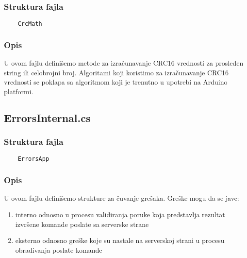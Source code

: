 \documentclass[a4paper]{extarticle}
\begin{document}
		\subsubsection*{Struktura fajla}
	\begin{verbatim}
	CrcMath
	\end{verbatim}
	
	\subsubsection*{Opis}
	U ovom fajlu definišemo metode za izračunavanje CRC16 vrednosti za prosleđen string ili celobrojni broj. Algoritami koji koristimo za izračunavanje CRC16 vrednosti se poklapa sa algoritmom koji je trenutno u upotrebi na Arduino platformi.
	
	\subsection{ErrorsInternal.cs}
	\label{a6}
		\subsubsection*{Struktura fajla}
	\begin{verbatim}
	ErrorsApp
	\end{verbatim}
	
	\subsubsection*{Opis}
	\label{errorsDesc}
	U ovom fajlu definišemo strukture za čuvanje grešaka. Greške mogu da se jave:
	\begin{enumerate}
		\item interno odnosno u procesu validiranja poruke koja predstavlja rezultat izvršene komande poslate sa serverske strane
		\item eksterno odnosno greške koje su nastale na serverskoj strani u procesu obrađivanja poslate komande 
	\end{enumerate}  
	
\end{document}
